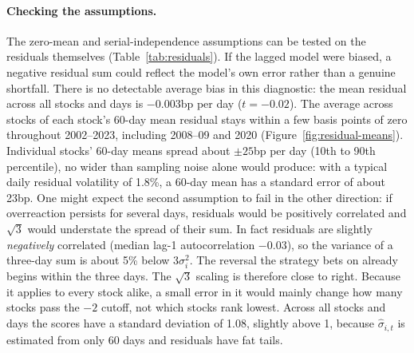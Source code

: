 \documentclass[11pt,letterpaper]{article}
\begin{document}
\paragraph{Checking the assumptions.} The zero-mean and serial-independence assumptions can
be tested on the residuals themselves (Table~\ref{tab:residuals}). If the lagged model were
biased, a negative residual sum could reflect the model's own error rather than a genuine
shortfall. There is no detectable average bias in this diagnostic: the mean residual across
all stocks and days is $-0.003$bp per day ($t = -0.02$). The average across stocks of each
stock's 60-day mean residual stays within a few basis points of zero throughout 2002--2023,
including 2008--09 and 2020 (Figure~\ref{fig:residual-means}). Individual stocks' 60-day
means spread about $\pm 25$bp per day (10th to 90th percentile), no wider than sampling
noise alone would produce: with a typical daily residual volatility of 1.8\%, a 60-day mean
has a standard error of about 23bp. One might expect the second assumption to fail in the
other direction: if overreaction persists for several days, residuals would be positively
correlated and $\sqrt{3}$ would understate the spread of their sum. In fact residuals are
slightly \emph{negatively} correlated (median lag-1 autocorrelation $-0.03$), so the
variance of a three-day sum is about 5\% below $3\sigma_i^2$. The reversal the strategy bets
on already begins within the three days. The $\sqrt{3}$ scaling is therefore close to right.
Because it applies to every stock alike, a small error in it would mainly change how many
stocks pass the $-2$ cutoff, not which stocks rank lowest. Across all stocks and days the
scores have a standard deviation of 1.08, slightly above 1, because $\hat\sigma_{i,t}$ is
estimated from only 60 days and residuals have fat tails.
\end{document}
